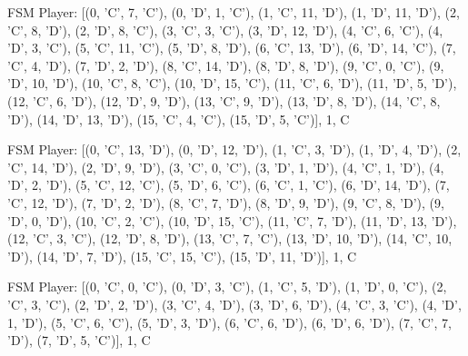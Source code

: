 \item FSM Player: [(0, 'C', 7, 'C'), (0, 'D', 1, 'C'), (1, 'C', 11, 'D'), (1, 'D', 11, 'D'), (2, 'C', 8, 'D'), (2, 'D', 8, 'C'), (3, 'C', 3, 'C'), (3, 'D', 12, 'D'), (4, 'C', 6, 'C'), (4, 'D', 3, 'C'), (5, 'C', 11, 'C'), (5, 'D', 8, 'D'), (6, 'C', 13, 'D'), (6, 'D', 14, 'C'), (7, 'C', 4, 'D'), (7, 'D', 2, 'D'), (8, 'C', 14, 'D'), (8, 'D', 8, 'D'), (9, 'C', 0, 'C'), (9, 'D', 10, 'D'), (10, 'C', 8, 'C'), (10, 'D', 15, 'C'), (11, 'C', 6, 'D'), (11, 'D', 5, 'D'), (12, 'C', 6, 'D'), (12, 'D', 9, 'D'), (13, 'C', 9, 'D'), (13, 'D', 8, 'D'), (14, 'C', 8, 'D'), (14, 'D', 13, 'D'), (15, 'C', 4, 'C'), (15, 'D', 5, 'C')], 1, C
\item FSM Player: [(0, 'C', 13, 'D'), (0, 'D', 12, 'D'), (1, 'C', 3, 'D'), (1, 'D', 4, 'D'), (2, 'C', 14, 'D'), (2, 'D', 9, 'D'), (3, 'C', 0, 'C'), (3, 'D', 1, 'D'), (4, 'C', 1, 'D'), (4, 'D', 2, 'D'), (5, 'C', 12, 'C'), (5, 'D', 6, 'C'), (6, 'C', 1, 'C'), (6, 'D', 14, 'D'), (7, 'C', 12, 'D'), (7, 'D', 2, 'D'), (8, 'C', 7, 'D'), (8, 'D', 9, 'D'), (9, 'C', 8, 'D'), (9, 'D', 0, 'D'), (10, 'C', 2, 'C'), (10, 'D', 15, 'C'), (11, 'C', 7, 'D'), (11, 'D', 13, 'D'), (12, 'C', 3, 'C'), (12, 'D', 8, 'D'), (13, 'C', 7, 'C'), (13, 'D', 10, 'D'), (14, 'C', 10, 'D'), (14, 'D', 7, 'D'), (15, 'C', 15, 'C'), (15, 'D', 11, 'D')], 1, C
\item FSM Player: [(0, 'C', 0, 'C'), (0, 'D', 3, 'C'), (1, 'C', 5, 'D'), (1, 'D', 0, 'C'), (2, 'C', 3, 'C'), (2, 'D', 2, 'D'), (3, 'C', 4, 'D'), (3, 'D', 6, 'D'), (4, 'C', 3, 'C'), (4, 'D', 1, 'D'), (5, 'C', 6, 'C'), (5, 'D', 3, 'D'), (6, 'C', 6, 'D'), (6, 'D', 6, 'D'), (7, 'C', 7, 'D'), (7, 'D', 5, 'C')], 1, C
